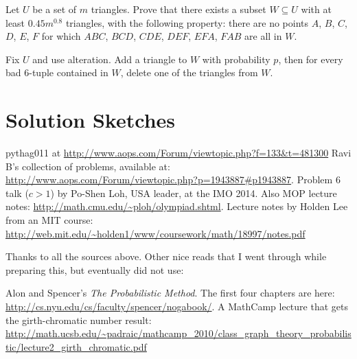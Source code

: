 \documentclass[11pt]{scrartcl}
\begin{document}
\begin{problem}
	[Korea 2016]
	Let $U$ be a set of $m$ triangles.
	Prove that there exists a subset $W \subseteq U$
	with at least $0.45 m^{0.8}$ triangles, with the following property:
	there are no points $A$, $B$, $C$, $D$, $E$, $F$
	for which $ABC$, $BCD$, $CDE$, $DEF$, $EFA$, $FAB$ are all in $W$.
	\begin{sketch}
		Fix $U$ and use alteration.
		Add a triangle to $W$ with probability $p$,
		then for every bad $6$-tuple contained in $W$,
		delete one of the triangles from $W$.
	\end{sketch}
\end{problem}



\section{Solution Sketches}


\begin{thebibliography}{99}
	 pythag011 at \url{http://www.aops.com/Forum/viewtopic.php?f=133&t=481300}
	 Ravi B's collection of problems, available at: \\ \url{http://www.aops.com/Forum/viewtopic.php?p=1943887#p1943887}.
	 Problem 6 talk ($c>1$) by Po-Shen Loh, USA leader, at the IMO 2014.
	 Also MOP lecture notes: \url{http://math.cmu.edu/~ploh/olympiad.shtml}.
	 Lecture notes by Holden Lee from an MIT course: \\ \url{http://web.mit.edu/~holden1/www/coursework/math/18997/notes.pdf}
\end{thebibliography}
Thanks to all the sources above.
Other nice reads that I went through while preparing this, but eventually did not use:
\begin{enumerate}
	\ii Alon and Spencer's \emph{The Probabilistic Method}. The first four chapters are here: \url{http://cs.nyu.edu/cs/faculty/spencer/nogabook/}.
	\ii A MathCamp lecture that gets the girth-chromatic number result:
	\\ \small \url{http://math.ucsb.edu/~padraic/mathcamp_2010/class_graph_theory_probabilistic/lecture2_girth_chromatic.pdf}
\end{enumerate}
\end{document}
